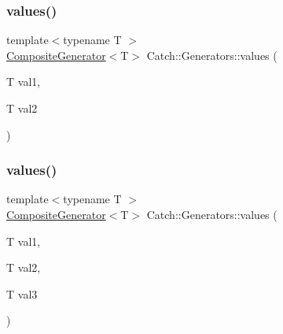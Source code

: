 \mbox{\label{namespace_catch_1_1_generators_a7a2c5bebb3c06c5b0ca05a80289b9eb1}} 
\subsubsection{\texorpdfstring{values()}{values()}\hspace{0.1cm}{\footnotesize\ttfamily [1/3]}}
{\footnotesize\ttfamily template$<$typename T $>$ \\
\hyperlink{class_catch_1_1_composite_generator}{Composite\+Generator}$<$T$>$ Catch\+::\+Generators\+::values (\begin{DoxyParamCaption}\item[{T}]{val1,  }\item[{T}]{val2 }\end{DoxyParamCaption})}

\mbox{\label{namespace_catch_1_1_generators_a496c4a826107e47203b6c609cfd8c2c5}} 
\subsubsection{\texorpdfstring{values()}{values()}\hspace{0.1cm}{\footnotesize\ttfamily [2/3]}}
{\footnotesize\ttfamily template$<$typename T $>$ \\
\hyperlink{class_catch_1_1_composite_generator}{Composite\+Generator}$<$T$>$ Catch\+::\+Generators\+::values (\begin{DoxyParamCaption}\item[{T}]{val1,  }\item[{T}]{val2,  }\item[{T}]{val3 }\end{DoxyParamCaption})}

\mbox{\label{namespace_catch_1_1_generators_afb1dcf02bfc8cdf990f27fdc7d7e4a4e}} 
